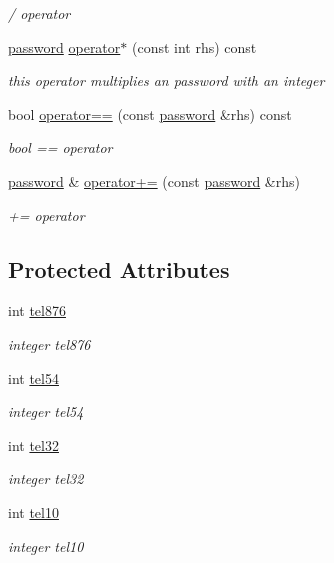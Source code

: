 \begin{DoxyCompactItemize}
\begin{DoxyCompactList}\small\item\em / operator \end{DoxyCompactList}\item 
\hyperlink{classpassword}{password} \hyperlink{classpassword_a775500307f55707d950c6605de07c400}{operator$\ast$} (const int rhs) const 
\begin{DoxyCompactList}\small\item\em this operator multiplies an password with an integer \end{DoxyCompactList}\item 
bool \hyperlink{classpassword_a528a04105bb089391277c217d8272462}{operator==} (const \hyperlink{classpassword}{password} \&rhs) const 
\begin{DoxyCompactList}\small\item\em bool == operator \end{DoxyCompactList}\item 
\hyperlink{classpassword}{password} \& \hyperlink{classpassword_a5c4a32e2761f6d35ddd7d633955e6b0e}{operator+=} (const \hyperlink{classpassword}{password} \&rhs)
\begin{DoxyCompactList}\small\item\em += operator \end{DoxyCompactList}\end{DoxyCompactItemize}
\subsection*{Protected Attributes}
\begin{DoxyCompactItemize}
\item 
int \hyperlink{classpassword_a0e2e6d171003a3a8594a2cfec2b9c059}{tel876}
\begin{DoxyCompactList}\small\item\em integer tel876 \end{DoxyCompactList}\item 
int \hyperlink{classpassword_ad5afb40aeb150953f66a1c14745297bc}{tel54}
\begin{DoxyCompactList}\small\item\em integer tel54 \end{DoxyCompactList}\item 
int \hyperlink{classpassword_a93ef3ccb4e71a683115c12435c89411d}{tel32}
\begin{DoxyCompactList}\small\item\em integer tel32 \end{DoxyCompactList}\item 
int \hyperlink{classpassword_af09c363ed2ec22c8e900fdd6bf66c1f6}{tel10}
\begin{DoxyCompactList}\small\item\em integer tel10 \end{DoxyCompactList}\end{DoxyCompactItemize}
